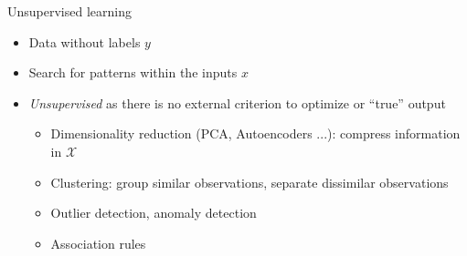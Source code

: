 \documentclass[11pt,compress,t,notes=noshow, xcolor=table]{beamer}
\begin{document}
\begin{vbframe}{Unsupervised learning}

\begin{itemize}

  \item Data without labels $y$
  
  \item Search for patterns within the inputs $x$
  
  \item \textit{Unsupervised} as there is no external criterion to optimize or 
  \enquote{true} output
  
  \begin{itemize}
  
    \item Dimensionality reduction (PCA, Autoencoders ...): compress 
    information in $\mathcal X$
    
    \item Clustering: group similar observations, separate dissimilar 
    observations
    
    \item Outlier detection, anomaly detection
    
    \item Association rules
  
  \end{itemize}

\end{itemize}
\end{vbframe}
\end{document}
